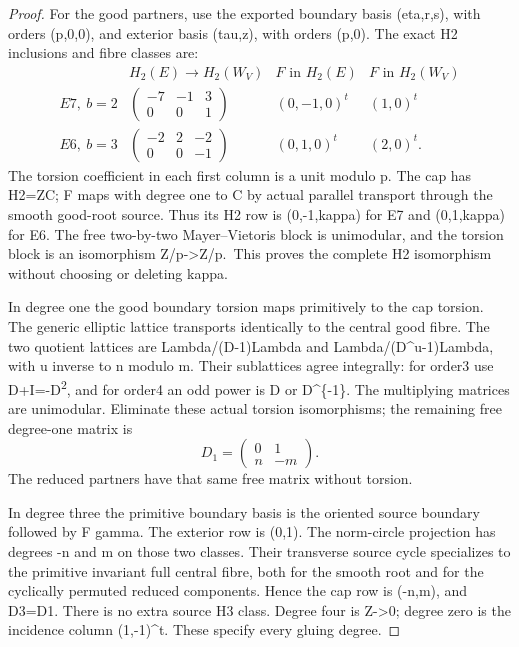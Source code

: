 \begin{proof}
For the good partners, use the exported boundary basis
(eta,r,s), with orders (p,0,0), and exterior basis (tau,z), with
orders (p,0). The exact H2 inclusions and fibre classes are:
\[
\begin{array}{c|c|c|c}
 & H_2(E)\longrightarrow H_2(W_V)&F\text{ in }H_2(E)&F\text{ in }H_2(W_V)\\
E7,\ b=2&
\begin{pmatrix}-7&-1&3\\0&0&1\end{pmatrix}&(0,-1,0)^t&(1,0)^t\\
E6,\ b=3&
\begin{pmatrix}-2&2&-2\\0&0&-1\end{pmatrix}&(0,1,0)^t&(2,0)^t .
\end{array}                                                     \tag{SC.3}
\]
The torsion coefficient in each first column is a unit modulo p.
The cap has H2=ZC; F maps with degree one to C by actual parallel
transport through the smooth good-root source. Thus its H2 row
is (0,-1,kappa) for E7 and (0,1,kappa) for E6. The free two-by-two
Mayer--Vietoris block is unimodular, and the torsion block is an
isomorphism Z/p-\textgreater Z/p.~This proves the complete H2 isomorphism
without choosing or deleting kappa.

In degree one the good boundary torsion maps primitively to the
cap torsion. The generic elliptic lattice transports identically
to the central good fibre. The two quotient lattices are
Lambda/(D-1)Lambda and Lambda/(D\^{}u-1)Lambda, with u inverse
to n modulo m. Their sublattices agree integrally: for order3
use D+I=-D\textsuperscript{2}, and for order4 an odd power is D or D\^{}\{-1\}.
The multiplying matrices are unimodular. Eliminate these actual
torsion isomorphisms; the remaining free degree-one matrix is
\[
                         D_1=\begin{pmatrix}0&1\\ n&-m\end{pmatrix}.
\]
The reduced partners have that same free matrix without torsion.

In degree three the primitive boundary basis is the oriented
source boundary followed by F gamma. The exterior row is (0,1).
The norm-circle projection has degrees -n and m on those two
classes. Their transverse source cycle specializes to the primitive
invariant full central fibre, both for the smooth root and for
the cyclically permuted reduced components. Hence the cap row
is (-n,m), and D3=D1. There is no extra source H3 class. Degree
four is Z-\textgreater0; degree zero is the incidence column (1,-1)\^{}t.
These specify every gluing degree.


\end{proof}

